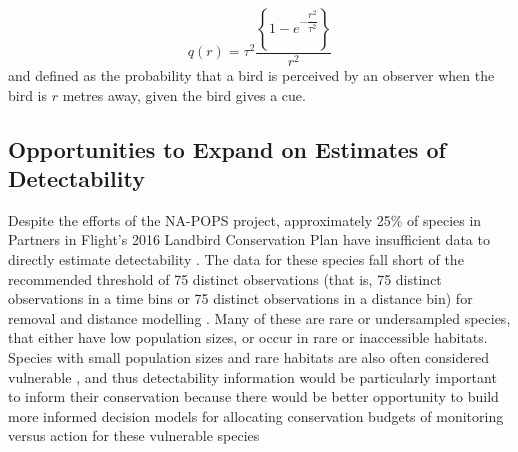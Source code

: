 \documentclass[12pt]{article}
\begin{document}
\begin{equation}\label{eq:perceptibility}
	q(r) = \tau^2\dfrac{\left\{1 - e^{-\dfrac{r^2}{\tau^2}}\right\}}{r^2}
\end{equation}
and defined as the probability that a bird is perceived by an observer when the bird is $r$ metres away, given the bird gives a cue.

\subsection{Opportunities to Expand on Estimates of Detectability}

\par Despite the efforts of the NA-POPS project, approximately 25\% of species in Partners in Flight’s 2016 Landbird Conservation Plan \citep{rosenberg_partners_2016} have insufficient data to directly estimate detectability \citep{edwards_point_2023}.
The data for these species fall short of the recommended threshold of 75 distinct observations (that is, 75 distinct observations in a time bins or 75 distinct observations in a distance bin) for removal and distance modelling \citep{buckland_introduction_2001, solymos_calibrating_2013}. 
Many of these are rare or undersampled species, that either have low population sizes, or occur in rare or inaccessible habitats.
Species with small population sizes and rare habitats are also often considered vulnerable \citep{davies_synergistic_2004, gray_effects_1989, segura_specialist_2007}, and thus detectability information would be particularly important to inform their conservation because there would be better opportunity to build more informed decision models for allocating conservation budgets of monitoring versus action for these vulnerable species \citep{bennett_when_2018,bennett_how_2024}
\end{document}
